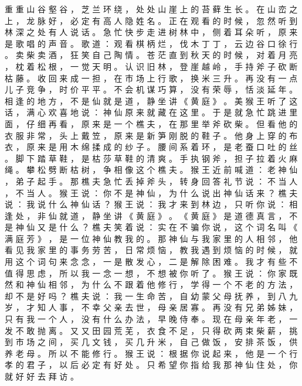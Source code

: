 {重 重 山 谷 壑 谷 ， 芝 兰 环 绕 ， 处 处 山 崖 上 的 苔 藓 生 长 。
在 山 峦 之 上 ， 龙 脉 好 ， 必 定 有 高 人 隐 姓 名 。
正 在 观 看 的 时 候 ， 忽 然 听 到 林 深 之 处 有 人 说 话 。
急 忙 快 步 走 进 树 林 中 ， 侧 着 耳 朵 听 ， 原 来 是 歌 唱 的 声 音 。
歌 道 ： 观 看 棋 柄 烂 ， 伐 木 丁 丁 ， 云 边 谷 口 徐 行 。
卖 柴 卖 酒 ， 狂 笑 自 己 陶 情 。
苍 茫 直 到 秋 天 的 时 候 ， 对 着 月 亮 ， 枕 着 松 根 ， 一 觉 天 明 。
认 识 旧 林 ， 登 崖 越 岭 ， 手 持 斧 子 砍 断 枯 藤 。
收 回 来 成 一 担 ， 在 市 场 上 行 歌 ， 换 米 三 升 。
再 没 有 一 点 儿 子 竞 争 ， 时 价 平 平 。
不 会 机 谋 巧 算 ， 没 有 荣 辱 ， 恬 淡 延 年 。
相 逢 的 地 方 ， 不 是 仙 就 是 道 ， 静 坐 讲 《 黄 庭 》 。
美 猴 王 听 了 这 话 ， 满 心 欢 喜 地 说 ： 神 仙 原 来 就 藏 在 这 里 。 于 是 就 急 忙 跳 进 里 面 ， 仔 细 再 看 ， 原 来 是 一 个 樵 夫 ， 在 那 里 举 斧 砍 柴 。
但 看 他 的 衣 服 非 常 ， 头 上 戴 笠 ， 原 来 是 新 笋 刚 脱 的 鞋 子 。
他 身 上 穿 的 布 衣 ， 原 来 是 用 木 绵 揉 成 的 纱 子 。
腰 间 系 着 环 ， 是 老 蚕 口 吐 的 丝 。
脚 下 踏 草 鞋 ， 是 枯 莎 草 鞋 的 清 爽 。
手 执 钢 斧 ， 担 子 拉 着 火 麻 绳 。
攀 松 劈 断 枯 树 ， 争 相 像 这 个 樵 夫 。
猴 王 近 前 喊 道 ： 老 神 仙 ， 弟 子 起 手 。
那 樵 夫 急 忙 丢 掉 斧 头 ， 转 身 回 答 礼 节 说 ： 不 当 人 ， 不 当 人 。
猴 王 说 ： 你 不 是 神 仙 ， 为 什 么 说 出 神 仙 话 来 ？ 樵 夫 说 ： 我 说 什 么 神 仙 话 ？ 猴 王 说 ： 我 才 来 到 林 边 ， 只 听 你 说 ： 相 逢 处 ， 非 仙 就 道 ， 静 坐 讲 《 黄 庭 》 。
《 黄 庭 》 是 道 德 真 言 ， 不 是 神 仙 又 是 什 么 ？ 樵 夫 笑 着 说 ： 实 在 不 骗 你 说 ， 这 个 词 名 叫 《 满 庭 芳 》 ， 是 一 位 神 仙 教 我 的 。
那 神 仙 与 我 家 里 的 人 相 邻 ， 他 看 见 我 家 里 的 事 务 劳 苦 ， 日 常 烦 恼 ， 教 我 遇 到 烦 恼 的 时 候 ， 就 用 这 个 词 句 来 念 念 ， 一 是 散 发 心 ， 二 是 解 除 困 难 。
我 才 有 些 不 值 得 思 虑 ， 所 以 我 一 念 一 想 ， 不 想 被 你 听 了 。
猴 王 说 ： 你 家 既 然 和 神 仙 相 邻 ， 为 什 么 不 跟 着 他 修 行 ， 学 得 一 个 不 老 的 方 法 ， 却 不 是 好 吗 ？ 樵 夫 说 ： 我 一 生 命 苦 ， 自 幼 蒙 父 母 抚 养 ， 到 八 九 岁 ， 才 知 人 事 ， 不 幸 父 亲 去 世 ， 母 亲 居 寡 。
再 没 有 兄 弟 姊 妹 ， 只 有 我 一 个 人 ， 没 有 什 么 办 法 ， 早 晚 侍 奉 。
现 在 母 亲 年 老 ， 一 发 不 敢 抛 离 。
又 又 田 园 荒 芜 ， 衣 食 不 足 ， 只 得 砍 两 束 柴 薪 ， 挑 到 市 场 之 间 ， 买 几 文 钱 ， 买 几 升 米 ， 自 己 做 饭 ， 安 排 茶 饭 ， 供 养 老 母 。
所 以 不 能 修 行 。
猴 王 说 ： 根 据 你 说 起 来 ， 他 是 一 个 行 孝 的 君 子 ， 以 后 必 定 有 好 处 。
只 希 望 你 指 给 我 那 神 仙 住 处 ， 你 就 好 好 去 拜 访 。
}
